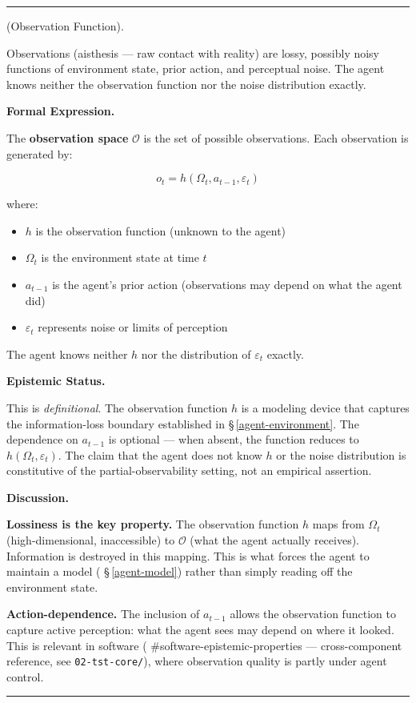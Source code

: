 \documentclass[11pt,oneside]{article}
\newcounter{claim}[section]
\renewcommand{\theclaim}{\thesection.\arabic{claim}}
\newenvironment{segment}[2]{%
  \refstepcounter{claim}%
  \bigskip\noindent\hrule\smallskip
  \noindent{\bfseries #1~\theclaim}\enskip(#2).\par\smallskip
  \noindent\ignorespaces
}{%
  \par\smallskip\noindent\hrule\bigskip
}
\newenvironment{definition}[1][]{\begin{segment}{Definition}{#1}}{\end{segment}}
\begin{document}
\begin{definition}[Observation Function]
\label{observation-function}
Observations (aisthesis — raw contact with reality) are lossy, possibly noisy functions of environment state, prior action, and perceptual noise. The agent knows neither the observation function nor the noise distribution exactly.



\medskip\noindent\textbf{Formal Expression.}



The \textbf{observation space} $\mathcal{O}$ is the set of possible observations. Each observation is generated by:

$$o_t = h(\Omega_t, a_{t-1}, \varepsilon_t)$$

where:
\begin{itemize}
  \item $h$ is the observation function (unknown to the agent)
  \item $\Omega_t$ is the environment state at time $t$
  \item $a_{t-1}$ is the agent's prior action (observations may depend on what the agent did)
  \item $\varepsilon_t$ represents noise or limits of perception
\end{itemize}



The agent knows neither $h$ nor the distribution of $\varepsilon_t$ exactly.


\medskip\noindent\textbf{Epistemic Status.}


This is \textit{definitional}. The observation function $h$ is a modeling device that captures the information-loss boundary established in \S\,\ref{agent-environment}. The dependence on $a_{t-1}$ is optional — when absent, the function reduces to $h(\Omega_t, \varepsilon_t)$. The claim that the agent does not know $h$ or the noise distribution is constitutive of the partial-observability setting, not an empirical assertion.


\medskip\noindent\textbf{Discussion.}


\textbf{Lossiness is the key property.} The observation function $h$ maps from $\Omega_t$ (high-dimensional, inaccessible) to $\mathcal{O}$ (what the agent actually receives). Information is destroyed in this mapping. This is what forces the agent to maintain a model ( \S\,\ref{agent-model}) rather than simply reading off the environment state.

\textbf{Action-dependence.} The inclusion of $a_{t-1}$ allows the observation function to capture active perception: what the agent sees may depend on where it looked. This is relevant in software ( \#software-epistemic-properties — cross-component reference, see \texttt{02-tst-core/}), where observation quality is partly under agent control.

\end{definition}
\end{document}
